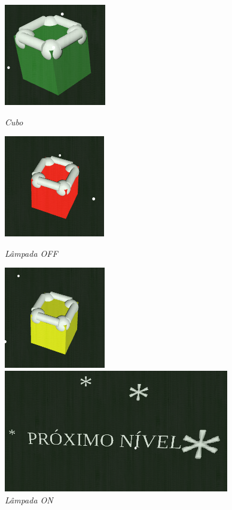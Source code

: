 \documentclass[a4paper,12pt]{article}
\begin{document}
\begin{figure}[h!]
\centering
\begin{minipage}{.5\textwidth}
  \centering
  \includegraphics[scale=0.7]{./imagens/Cubo.png}
  \caption{\emph{Cubo}} \label{Fig:Cubo}
\end{minipage}%
\begin{minipage}{.5\textwidth}
  \centering
  \includegraphics[scale=0.7]{./imagens/LampadaOFF.png}
  \caption{\emph{Lâmpada OFF}} \label{Fig:LampadaOFF}
\end{minipage}
\begin{minipage}{.5\textwidth}
  \centering
  \includegraphics[scale=0.7]{./imagens/LampadaON.png}
  \caption{\emph{Lâmpada ON}} \label{Fig:LampadaON}
\end{minipage}
\begin{minipage}{.5\textwidth}
  \centering
  \includegraphics[scale=0.4]{./imagens/proximoNivel.png}

\end{minipage}
\end{figure}
\end{document}
